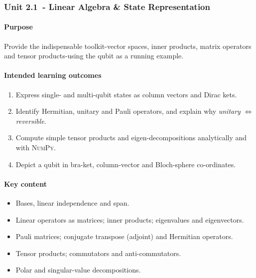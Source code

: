 \subsubsection*{Unit 2.1 - Linear Algebra \& State Representation}

\paragraph{Purpose}  
Provide the indispensable toolkit-vector spaces, inner products, matrix operators 
and tensor products-using the qubit as a running example.


\paragraph{Intended learning outcomes}
\begin{enumerate}[label=2.1-\arabic*]
	\item Express single- and multi-qubit states as column vectors and Dirac kets.
	\item Identify Hermitian, unitary and Pauli operators, 
	and explain why \emph{unitary} $\Longleftrightarrow$ \emph{reversible}.
	\item Compute simple tensor products and eigen-decompositions analytically and with \textsc{NumPy}.
	\item Depict a qubit in bra-ket, column-vector and Bloch-sphere co-ordinates.
\end{enumerate}

\paragraph{Key content}
\begin{itemize}
	\item Bases, linear independence and span.  
	\item Linear operators as matrices; inner products; eigenvalues and eigenvectors.  
	\item Pauli matrices; conjugate transpose (adjoint) and Hermitian operators.  
	\item Tensor products; commutators and anti-commutators.
	\item Polar and singular-value decompositions.
\end{itemize}

